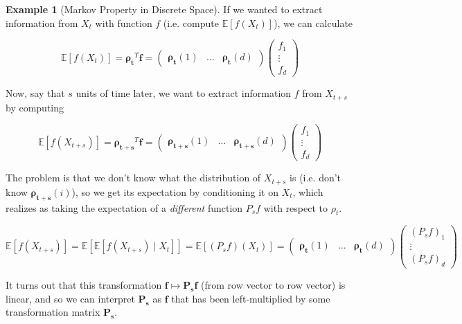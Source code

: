 \documentclass{article}
\theoremstyle{definition}
\newtheorem{example}{Example}[section]
\theoremstyle{remark}
\theoremstyle{definition}
\begin{document}
  \begin{example}[Markov Property in Discrete Space]
    If we wanted to extract information from $X_t$ with function $f$ (i.e. compute $\mathbb{E}[f(X_t)]$), we can calculate 

      \[\mathbb{E}[f(X_t)] = \boldsymbol{\rho_t}^T \mathbf{f} =  \begin{pmatrix} \boldsymbol{\rho_t} (1) & \ldots & \boldsymbol{\rho_t} (d) \end{pmatrix} \begin{pmatrix} f_1 \\ \vdots \\ f_d \end{pmatrix}\] 

    Now, say that $s$ units of time later, we want to extract information $f$ from $X_{t + s}$ by computing 

      \[\mathbb{E}[f(X_{t + s})] = \boldsymbol{\rho_{t + s}}^T \mathbf{f} = \begin{pmatrix} \boldsymbol{\rho_{t + s}} (1) & \ldots &  \boldsymbol{\rho_{t + s}} (d) \end{pmatrix} \begin{pmatrix} f_1 \\ \vdots \\ f_d \end{pmatrix}\]

    The problem is that we don't know what the distribution of $X_{t + s}$ is (i.e. don't know $\boldsymbol{\rho_{t + s}} (i)$), so we get its expectation by conditioning it on $X_t$, which realizes as taking the expectation of a \textit{different} function $P_s f$ with respect to $\rho_t$. 

      \[\mathbb{E}[f(X_{t + s})] = \mathbb{E}[ \mathbb{E}[ f(X_{t + s}) \mid X_t]] = \mathbb{E}[(P_s f)(X_t)] = \begin{pmatrix} \boldsymbol{\rho_t} (1) & \ldots & \boldsymbol{\rho_t} (d) \end{pmatrix} \begin{pmatrix} (P_s f)_1 \\ \vdots \\(P_s f)_d \end{pmatrix}\]

    It turns out that this transformation $\mathbf{f} \mapsto \mathbf{P_s} \mathbf{f}$ (from row vector to row vector) is linear, and so we can interpret $\mathbf{P_s}$ as $\mathbf{f}$ that has been left-multiplied by some transformation matrix $\mathbf{P_s}$. 


\end{example}
\end{document}
